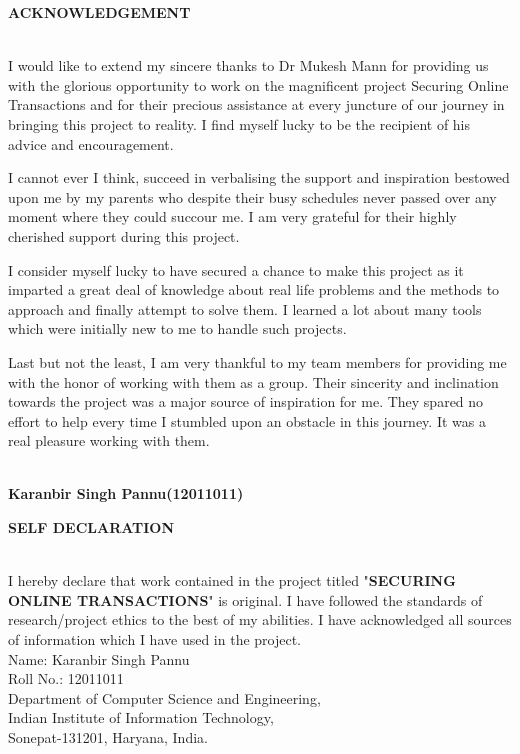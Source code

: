 \documentclass[12pt, oneside, a4paper]{article}
\begin{document}
\thispagestyle{empty}
\pagebreak
\begin{center}
    \begin{Large}\textbf{ACKNOWLEDGEMENT}\end{Large}
\end{center}\\
\vspace{1cm}
I would like to extend my sincere thanks to Dr Mukesh Mann for providing us with the glorious opportunity to work on the magnificent project Securing Online Transactions and for their precious assistance at every juncture of our journey in bringing this project to reality. I find myself lucky to be the recipient of his advice and encouragement. 

I cannot ever I think, succeed in verbalising the support and inspiration bestowed upon me by my parents who despite their busy schedules never passed over any moment where they could succour me. I am very grateful for their highly cherished support during this project.

I consider myself lucky to have secured a chance to make this project as it imparted a great deal of knowledge about real life problems and the methods to approach and finally attempt to solve them. I learned a lot about many tools which were initially new to me to handle such projects. 

Last but not the least, I am very thankful to my team members for providing me with the honor of working with them as a group. Their sincerity and inclination towards the project was a major source of inspiration for me. They spared no effort to help every time I stumbled upon an obstacle in this journey. It was a real pleasure working with them.

\vspace{2cm}\\
\textbf{Karanbir Singh Pannu(12011011)}
\setcounter{page}{2}
\pagebreak

\begin{center}
    \begin{Large}\textbf{SELF DECLARATION}\end{Large}
\end{center}\\
\vspace{1cm}
I hereby declare that work contained in the project titled "\textbf{SECURING ONLINE TRANSACTIONS}" is original. I have followed the standards of research/project ethics to the best of my abilities. I have acknowledged all sources of information which I have used in the project.
\vspace{4cm}\\
Name: Karanbir Singh Pannu\\
Roll No.: 12011011\\
Department of Computer Science and Engineering,\\
Indian Institute of Information Technology,\\
Sonepat-131201, Haryana, India.
\pagebreak
\end{document}
